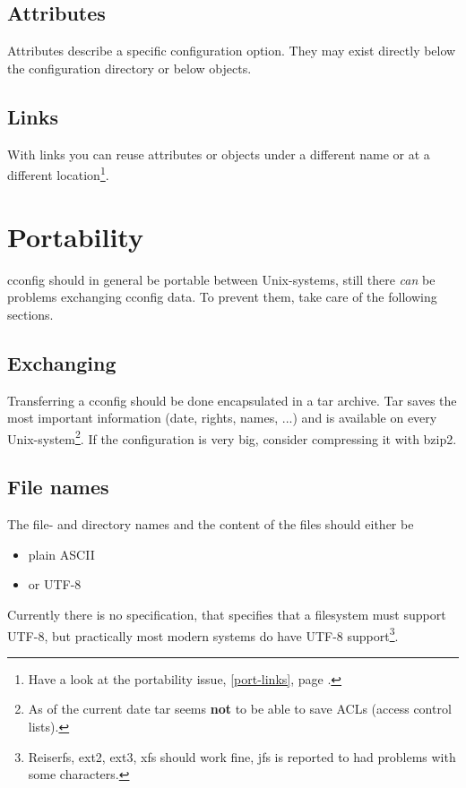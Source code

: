 \documentclass[11pt,a4paper]{article}
\begin{document}
\subsection{Attributes}
Attributes describe a specific configuration option.
They may exist directly below the configuration directory or below objects.
\subsection{Links}
With links you can reuse attributes or objects under a different name
or at a different location\footnote{Have a look at the portability issue,
\ref{port-links}, page \pageref{port-links}.}.
\section{Portability}
\label{requirements}
cconfig should in general be portable between Unix-systems, still
there \textit{can} be problems exchanging cconfig data. To prevent
them, take care of the following sections.
\subsection{Exchanging}
Transferring a cconfig should be done encapsulated in a tar\cite{tar} archive.
Tar saves the most important information (date, rights, names, ...)
and is available on every Unix-system\footnote{As of the current date
tar seems \textbf{not} to be able to save ACLs (access control lists).}.
If the configuration is very big, consider compressing it with bzip2\cite{bzip2}.
\subsection{File names}
The file- and directory names and the content of the files should either be
\begin{itemize}
\item plain ASCII
\item or UTF-8\cite{utf8}
\end{itemize}
Currently there is no specification, that specifies that a filesystem
must support UTF-8, but practically most modern systems do have
UTF-8 support\footnote{Reiserfs, ext2, ext3, xfs should work fine, jfs
is reported to had problems with some characters.}.
\end{document}
